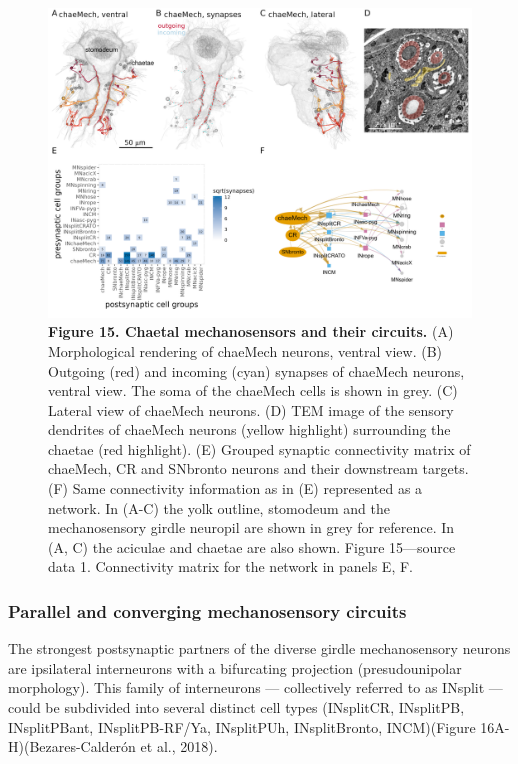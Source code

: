\documentclass[
  11pt,
]{article}
\begin{document}
\begin{figure}[H]

{\centering \includegraphics[width=1\textwidth,height=\textheight]{Figures/Figure15.png}

}

\caption{\textbf{Figure 15. Chaetal mechanosensors and their circuits.}
(A) Morphological rendering of chaeMech neurons, ventral view. (B)
Outgoing (red) and incoming (cyan) synapses of chaeMech neurons, ventral
view. The soma of the chaeMech cells is shown in grey. (C) Lateral view
of chaeMech neurons. (D) TEM image of the sensory dendrites of chaeMech
neurons (yellow highlight) surrounding the chaetae (red highlight). (E)
Grouped synaptic connectivity matrix of chaeMech, CR and SNbronto
neurons and their downstream targets. (F) Same connectivity information
as in (E) represented as a network. In (A-C) the yolk outline, stomodeum
and the mechanosensory girdle neuropil are shown in grey for reference.
In (A, C) the aciculae and chaetae are also shown. Figure 15---source
data 1. Connectivity matrix for the network in panels E, F.}

\end{figure}%

\subsubsection{Parallel and converging mechanosensory
circuits}\label{parallel-and-converging-mechanosensory-circuits}

The strongest postsynaptic partners of the diverse girdle mechanosensory
neurons are ipsilateral interneurons with a bifurcating projection
(presudounipolar morphology). This family of interneurons ---
collectively referred to as INsplit --- could be subdivided into several
distinct cell types (INsplitCR, INsplitPB, INsplitPBant,
INsplitPB-RF/Ya, INsplitPUh, INsplitBronto, INCM)(Figure
16A-H)(Bezares-Calderón et al., 2018).
\end{document}
